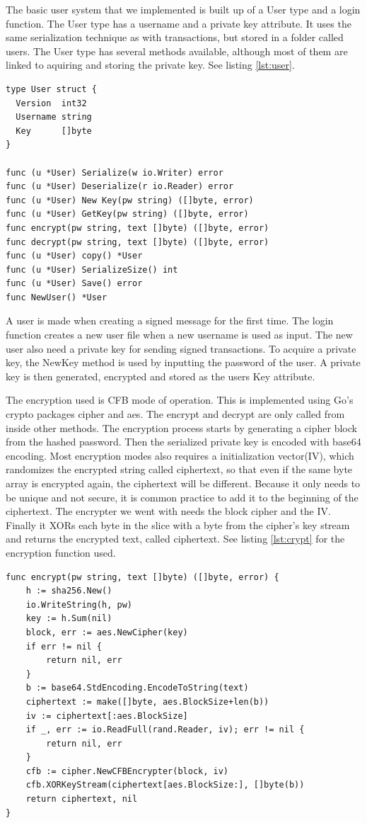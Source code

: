 \documentclass[12pt]{article}
\begin{document}
The basic user system that we implemented is built up of a User type and a login function. The User type has a username and a private key attribute. It uses the same serialization technique as with transactions, but stored in a folder called users. The User type has several methods available, although most of them are linked to aquiring and storing the private key. See listing \ref{lst:user}.

\begin{lstlisting}[float=h!,caption={User},label=lst:user]
type User struct {
  Version  int32
  Username string
  Key      []byte
}

func (u *User) Serialize(w io.Writer) error 
func (u *User) Deserialize(r io.Reader) error 
func (u *User) New Key(pw string) ([]byte, error)
func (u *User) GetKey(pw string) ([]byte, error) 
func encrypt(pw string, text []byte) ([]byte, error) 
func decrypt(pw string, text []byte) ([]byte, error) 
func (u *User) copy() *User 
func (u *User) SerializeSize() int 
func (u *User) Save() error 
func NewUser() *User 
\end{lstlisting}

A user is made when creating a signed message for the first time. The login function creates a new user file when a new username is used as input. The new user also need a private key for sending signed transactions. To acquire a private key, the NewKey method is used by inputting the password of the user. A private key is then generated, encrypted and stored as the users Key attribute. 

The encryption used is CFB mode of operation. This is implemented using Go's crypto packages cipher and aes. The encrypt and decrypt are only called from inside other methods. The encryption process starts by generating a cipher block from the hashed password. Then the serialized private key is encoded with base64 encoding. Most encryption modes also requires a initialization vector(IV), which randomizes the encrypted string called ciphertext, so that even if the same byte array is encrypted again, the ciphertext will be different. Because it only needs to be unique and not secure, it is common practice to add it to the beginning of the ciphertext. The encrypter we went with needs the block cipher and the IV. Finally it XORs each byte in the slice with a byte from the cipher's key stream and returns the encrypted text, called ciphertext. See listing \ref{lst:crypt} for the encryption function used.

\begin{lstlisting}[float=h!,caption={Encryption},label=lst:crypt]
func encrypt(pw string, text []byte) ([]byte, error) {
	h := sha256.New()
	io.WriteString(h, pw)
	key := h.Sum(nil)
	block, err := aes.NewCipher(key)
	if err != nil {
		return nil, err
	}
	b := base64.StdEncoding.EncodeToString(text)
	ciphertext := make([]byte, aes.BlockSize+len(b))
	iv := ciphertext[:aes.BlockSize]
	if _, err := io.ReadFull(rand.Reader, iv); err != nil {
		return nil, err
	}
	cfb := cipher.NewCFBEncrypter(block, iv)
	cfb.XORKeyStream(ciphertext[aes.BlockSize:], []byte(b))
	return ciphertext, nil
}
\end{lstlisting}
\end{document}
